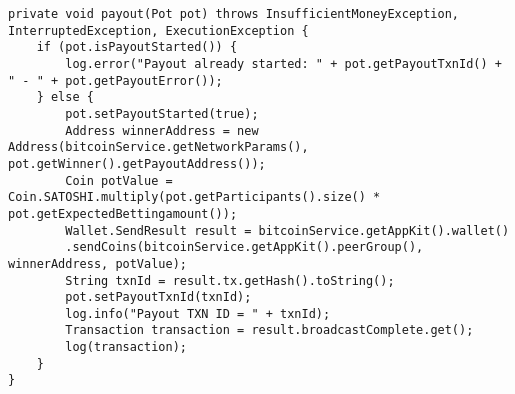 \begin{lstlisting}[basicstyle=\small]
private void payout(Pot pot) throws InsufficientMoneyException, InterruptedException, ExecutionException {
    if (pot.isPayoutStarted()) {
        log.error("Payout already started: " + pot.getPayoutTxnId() + " - " + pot.getPayoutError());
    } else {
        pot.setPayoutStarted(true);
        Address winnerAddress = new Address(bitcoinService.getNetworkParams(), pot.getWinner().getPayoutAddress());
        Coin potValue = Coin.SATOSHI.multiply(pot.getParticipants().size() * pot.getExpectedBettingamount());
        Wallet.SendResult result = bitcoinService.getAppKit().wallet()
        .sendCoins(bitcoinService.getAppKit().peerGroup(), winnerAddress, potValue);
        String txnId = result.tx.getHash().toString();
        pot.setPayoutTxnId(txnId);
        log.info("Payout TXN ID = " + txnId);
        Transaction transaction = result.broadcastComplete.get();
        log(transaction);
    }
}
\end{lstlisting}


